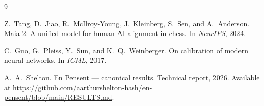 \documentclass[11pt,a4paper]{article}
\begin{document}

\begin{thebibliography}{9}

Z.~Tang, D.~Jiao, R.~McIlroy-Young, J.~Kleinberg, S.~Sen, and A.~Anderson.
\newblock Maia-2: A unified model for human-AI alignment in chess.
\newblock In \emph{NeurIPS}, 2024.

C.~Guo, G.~Pleiss, Y.~Sun, and K.~Q.~Weinberger.
\newblock On calibration of modern neural networks.
\newblock In \emph{ICML}, 2017.

A.~A.~Shelton.
\newblock En Pensent — canonical results.
\newblock Technical report, 2026. Available at
\url{https://github.com/aarthurshelton-hash/en-pensent/blob/main/RESULTS.md}.

\end{thebibliography}
\end{document}
